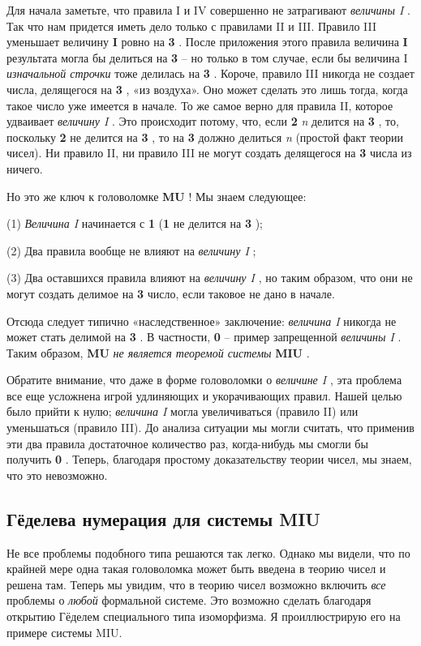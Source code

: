 \documentclass[../main.tex]{subfiles}
\begin{document}
Для начала заметьте, что правила I и IV совершенно не затрагивают \emph{величины I} . Так что нам придется иметь дело только с правилами II и III\@. Правило III уменьшает величину \textbf{I} ровно на \textbf{3} . После приложения этого правила величина \textbf{I} результата могла бы делиться на \textbf{3} \--- но только в том случае, если бы величина I \emph{изначальной строчки} тоже делилась на \textbf{3} . Короче, правило III никогда не создает числа, делящегося на \textbf{3} , «из воздуха». Оно может сделать это лишь тогда, когда такое число уже имеется в начале. То же самое верно для правила II, которое удваивает \emph{величину I} . Это происходит потому, что, если \textbf{2} \emph{n} делится на \textbf{3} , то, поскольку \textbf{2} не делится на \textbf{3} , то на \textbf{3} должно делиться \emph{n} (простой факт теории чисел). Ни правило II, ни правило III не могут создать делящегося на \textbf{3} числа из ничего.

Но это же ключ к головоломке \textbf{MU} ! Мы знаем следующее:

(1) \emph{Величина I} начинается с \textbf{1} (\textbf{1} не делится на \textbf{3} );

(2) Два правила вообще не влияют на \emph{величину I} ;

(3) Два оставшихся правила влияют на \emph{величину I} , но таким образом, что они не могут создать делимое на \textbf{3} число, если таковое не дано в начале.

Отсюда следует типично «наследственное» заключение: \emph{величина I} никогда не может стать делимой на \textbf{3} . В частности, \textbf{0} \--- пример запрещенной \emph{величины I} . Таким образом, \textbf{MU} \emph{не является теоремой системы} \textbf{MIU} .

Обратите внимание, что даже в форме головоломки о \emph{величине I} , эта проблема все еще усложнена игрой удлиняющих и укорачивающих правил. Нашей целью было прийти к нулю; \emph{величина I} могла увеличиваться (правило II) или уменьшаться (правило III). До анализа ситуации мы могли считать, что применив эти два правила достаточное количество раз, когда-нибудь мы смогли бы получить \textbf{0} . Теперь, благодаря простому доказательству теории чисел, мы знаем, что это невозможно.


\subsection{Гёделева нумерация для системы MIU}

Не все проблемы подобного типа решаются так легко. Однако мы видели, что по крайней мере одна такая головоломка может быть введена в теорию чисел и решена там. Теперь мы увидим, что в теорию чисел возможно включить \emph{все} проблемы о \emph{любой} формальной системе. Это возможно сделать благодаря открытию Гёделем специального типа изоморфизма. Я проиллюстрирую его на примере системы MIU.
\end{document}
